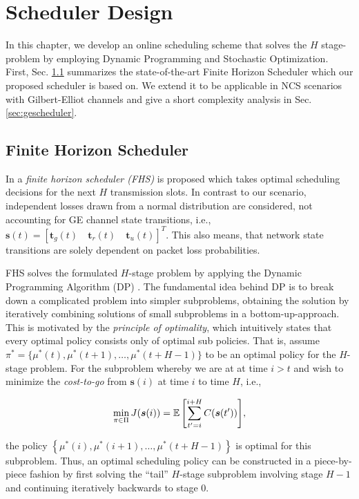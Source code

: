 \chapter{Scheduler Design}

In this chapter, we develop an online scheduling scheme that solves the $H$
stage-problem by employing Dynamic Programming and Stochastic Optimization.
First, Sec. \ref{sec:fhscheduler} summarizes the state-of-the-art Finite Horizon
Scheduler which our proposed scheduler is based on. We extend it to be
applicable in NCS scenarios with Gilbert-Elliot channels and give a short
complexity analysis in Sec. \ref{sec:gescheduler}.

\section{Finite Horizon Scheduler} \label{sec:fhscheduler}

In \cite{ayan2020aoi} a \textit{finite horizon scheduler (FHS)} is proposed
which takes optimal scheduling decisions for the next $H$ transmission slots. In
contrast to our scenario, independent losses drawn from a normal distribution
are considered, not accounting for GE channel state transitions, i.e.,
$\boldsymbol{s}(t) = \left[\boldsymbol{t}_g(t) \quad \boldsymbol{t}_r(t) \quad
\boldsymbol{t}_u(t) \right]^T$. This also means, that network state transitions
are solely dependent on packet loss probabilities.  

FHS solves the formulated $H$-stage problem by applying the Dynamic Programming
Algorithm (DP) \cite{bertsekas1995dynamic}. The fundamental idea behind DP is to
break down a complicated problem into simpler subproblems, obtaining the
solution by iteratively combining solutions of small subproblems in a
bottom-up-approach. This is motivated by the \textit{principle of optimality},
which intuitively states that every optimal policy consists only of optimal sub
policies. That is, assume $\pi^* = \{\mu^*(t), \mu^*(t+1), \dots, \mu^*(t+H-1)
\}$ to be an optimal policy for the $H$-stage problem. For the subproblem
whereby we are at at time $i>t$ and wish to minimize the \textit{cost-to-go}
from $\boldsymbol{s}(i)$ at time $i$ to time $H$, i.e.,

\begin{equation}
  \label{eq:costtogo}
  \min_{\pi\in\Pi}{J(\boldsymbol{s}(i)) = \mathbb{E} \left[ \sum_{t' = i }^{i+H} C(\boldsymbol{s}(t')) \right]},
\end{equation}

the policy $\left\{ \mu^*(i), \mu^*(i+1), \dots, \mu^*(t+H-1) \right\}$ is
optimal for this subproblem. Thus, an optimal scheduling policy can be
constructed in a piece-by-piece fashion by first solving the ``tail'' $H$-stage
subproblem involving stage $H-1$ and continuing iteratively backwards to stage
$0$. 

